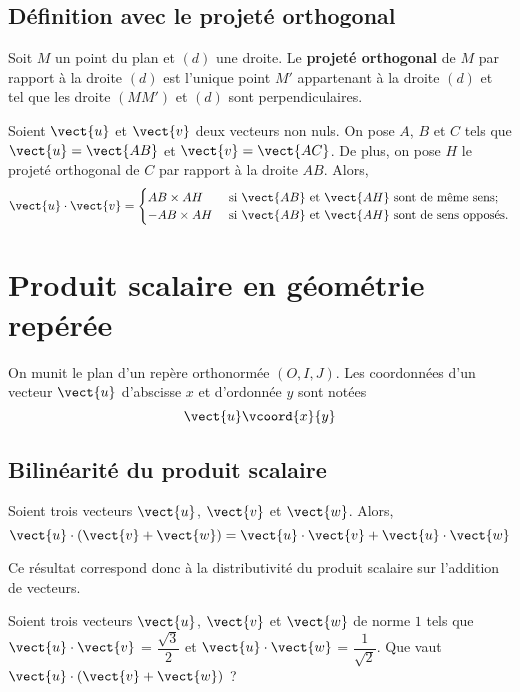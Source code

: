 \documentclass{article}
\begin{document}
\subsection{Définition avec le projeté orthogonal}
\begin{tcolorbox}
    
\begin{definition}[Rappel]
Soit $M$ un point du plan et $(d)$ une droite. Le \textbf{projeté orthogonal} de $M$ par rapport à la droite $(d)$ est l'unique point $M'$ appartenant à la droite $(d)$ et tel que les droite $(MM')$ et $(d)$ sont perpendiculaires.
\end{definition}
\end{tcolorbox}
\begin{proposition}
Soient $\vect{u}$ et $\vect{v}$ deux vecteurs non nuls. On pose $A$, $B$ et $C$ tels que $\vect{u} = \vect{AB}$ et $\vect{v} = \vect{AC}$. De plus, on pose $H$ le projeté orthogonal de $C$ par rapport à la droite $AB$. Alors,
\begin{equation*}
\vect{u} \cdot \vect{v} = 
\begin{cases}
AB \times AH & \text{ si $\vect{AB}$ et $\vect{AH}$ sont de même sens;}\\
- AB \times AH& \text{ si $\vect{AB}$ et $\vect{AH}$ sont de sens opposés.}
\end{cases}
\end{equation*}
\end{proposition}
\emptybox{3cm}

\newpage
\section{Produit scalaire en géométrie repérée}
On munit le plan d'un repère orthonormée $(O,I,J)$. Les coordonnées d'un vecteur $\vect{u}$ d'abscisse $x$ et d'ordonnée $y$ sont notées
\begin{equation*}
\vect{u}\vcoord{x}{y}
\end{equation*}
\subsection{Bilinéarité du produit scalaire}
\begin{proposition}
Soient trois vecteurs $\vect{u}$, $\vect{v}$ et $\vect{w}$. Alors,
\begin{equation*}
\vect{u} \cdot (\vect{v} + \vect{w}) = \vect{u} \cdot \vect{v} + \vect{u} \cdot \vect{w}
\end{equation*}
\end{proposition}
\begin{remark}
Ce résultat correspond donc à la distributivité du produit scalaire sur l'addition de vecteurs.
\end{remark}
\begin{example}
Soient trois vecteurs $\vect{u}$, $\vect{v}$ et $\vect{w}$ de norme $1$ tels que $\vect{u} \cdot \vect{v}$ = $\dfrac{\sqrt{3}}{2}$  et $\vect{u} \cdot \vect{w}$ = $\dfrac{1}{\sqrt{2}}$. Que vaut $\vect{u} \cdot (\vect{v} + \vect{w})$ ?

\answersline
\end{example}
\end{document}
